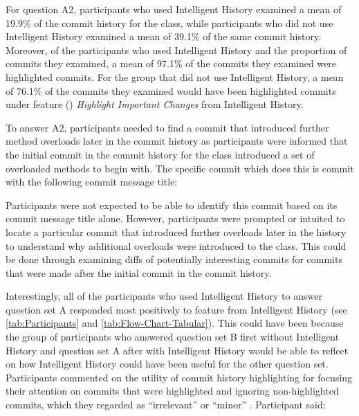 For question A2, participants who used Intelligent History examined a mean of 19.9\% of the commit history for the  class,
while participants who did not use Intelligent History examined a mean of 39.1\% of the same commit history. 
Moreover, of the participants who used Intelligent History and the proportion of commits they examined,
a mean of 97.1\% of the commits they examined were highlighted commits.
For the group that did not use Intelligent History, a mean of 76.1\% of the commits they examined would have been highlighted commits under feature () \textit{Highlight Important Changes} from Intelligent History.

To answer A2, participants needed to find a commit that introduced further  method overloads later in the commit history as participants were informed that the initial commit in the commit history for the  class introduced a set of overloaded  methods to begin with.
The specific commit which does this is commit  with the following commit message title:

\begin{center}
\end{center}

Participants were not expected to be able to identify this commit based on its commit message title alone.
However, participants were prompted or intuited to locate a particular commit that introduced further overloads later in the history to understand why additional overloads were introduced to the  class.
This could be done through examining diffs of potentially interesting commits for commits that were made after the initial commit in the  commit history.

Interestingly, all of the participants who used Intelligent History to answer question set A responded most positively to feature  from Intelligent History  (see \autoref{tab:Participants} and \autoref{tab:Flow-Chart-Tabular}).
This could have been because the group of participants who answered question set B first without Intelligent History 
and question set A after with Intelligent History would be able to reflect on how Intelligent History could have been useful for the other question set.
Participants commented on the utility of commit history highlighting for focusing their attention on commits that were highlighted and ignoring non-highlighted commits, which they regarded as ``irrelevant'' or ``minor'' .
Participant  said:

